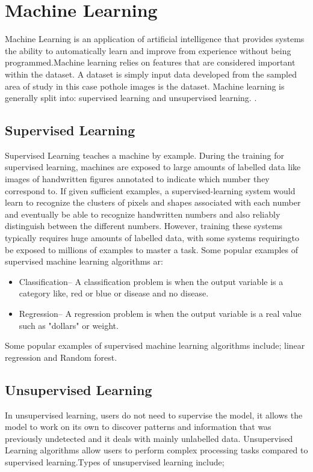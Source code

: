 \documentclass[12pt]{report}
\begin{document}
\section{Machine Learning}
Machine Learning is an application of artificial intelligence that provides systems the ability to automatically learn and improve from experience without being programmed.Machine learning relies on features that are considered important within the dataset. A dataset is simply input data developed from the sampled area of study in this case pothole images is the dataset. Machine learning is generally split into: supervised learning and unsupervised learning. \cite{Machine--Learning}. 

\subsection{Supervised Learning}
Supervised Learning teaches a machine by example. During the training for supervised learning, machines are exposed to large amounts of labelled data like images of handwritten figures annotated to indicate which number they correspond to. If given sufficient examples, a supervised-learning system would learn to recognize the clusters of pixels and shapes associated with each number and eventually be able to recognize handwritten numbers and also reliably distinguish between the different numbers\cite{Supervised}.
However, training these systems typically requires huge amounts of labelled data, with some systems requiringto be exposed to  millions of examples to master a task. Some popular examples of supervised machine learning algorithms ar\cite{Super}:

\begin{itemize}[topsep=0pt]

\item Classification-- A classification problem is when the output variable is a category like, red or blue or disease and no disease.

\item Regression-- A regression problem is when the output variable is a real value such as "dollars" or weight.

\end{itemize}
Some popular examples of supervised machine learning algorithms include;  linear regression and Random forest.

\subsection{Unsupervised Learning}
In unsupervised learning, users do not need to supervise the model, it allows the model to work on its own to discover patterns and information that was previously undetected and it deals with mainly unlabelled data. Unsupervised Learning algorithms allow users to perform complex processing tasks compared to supervised learning\cite{Super}.Types of unsupervised learning include;
\end{document}
